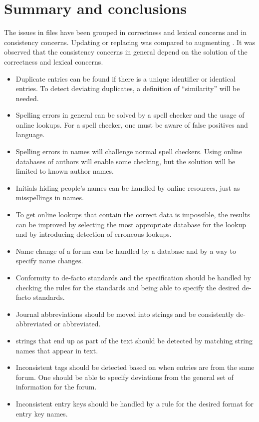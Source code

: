 \section{Summary and conclusions}

The issues in {\bibtex} files have been grouped in correctness and
lexical concerns and in consistency concerns.  Updating or replacing
{\bibtex} was compared to augmenting {\bibtex}.  It was observed that
the consistency concerns in general depend on the solution of the
correctness and lexical concerns.

\begin{itemize}
\item Duplicate entries can be found if there is a unique identifier
  or identical entries.  To detect deviating duplicates, a definition
  of ``similarity'' will be needed.

\item Spelling errors in general can be solved by a spell checker and
  the usage of online lookups.  For a spell checker, one must be aware
  of false positives and language.

\item Spelling errors in names will challenge normal spell checkers.
  Using online databases of authors will enable some checking, but the
  solution will be limited to known author names.

\item Initials hiding people's names can be handled by online
  resources, just as misspellings in names.

\item To get online lookups that contain the correct data is
  impossible, the results can be improved by selecting the most
  appropriate database for the lookup and by introducing detection of
  erroneous lookups.

\item Name change of a forum can be handled by a database and by a way
  to specify name changes.

\item Conformity to de-facto standards and the {\bibtex} specification
  should be handled by checking the rules for the standards and being
  able to specify the desired de-facto standards.

\item Journal abbreviations should be moved into strings and be
  consistently de-abbreviated or abbreviated.

\item {\bibtex} strings that end up as part of the text should be
  detected by matching string names that appear in text.

\item Inconsistent tags should be detected based on when entries are
  from the same forum.  One should be able to specify deviations from
  the general set of information for the forum.

\item Inconsistent entry keys should be handled by a rule for the
  desired format for entry key names.
\end{itemize}

